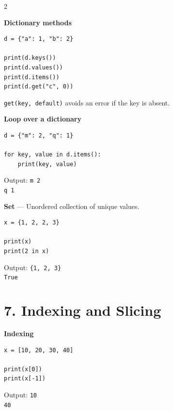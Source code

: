 \documentclass[10pt,a4paper]{article}
\begin{document}
\begin{multicols}{2}
\begin{card}
\textbf{Dictionary methods}

\begin{lstlisting}[style=pythonstyle]
d = {"a": 1, "b": 2}

print(d.keys())
print(d.values())
print(d.items())
print(d.get("c", 0))
\end{lstlisting}

\texttt{get(key, default)} avoids an error if the key is absent.
\end{card}

\begin{card}
\textbf{Loop over a dictionary}

\begin{lstlisting}[style=pythonstyle]
d = {"m": 2, "q": 1}

for key, value in d.items():
    print(key, value)
\end{lstlisting}

Output:
\texttt{m 2}\\
\texttt{q 1}
\end{card}

\begin{card}
\textbf{Set} --- Unordered collection of unique values.

\begin{lstlisting}[style=pythonstyle]
x = {1, 2, 2, 3}

print(x)
print(2 in x)
\end{lstlisting}

Output:
\texttt{\{1, 2, 3\}}\\
\texttt{True}
\end{card}

\section*{7. Indexing and Slicing}

\begin{card}
\textbf{Indexing}

\begin{lstlisting}[style=pythonstyle]
x = [10, 20, 30, 40]

print(x[0])
print(x[-1])
\end{lstlisting}

Output:
\texttt{10}\\
\texttt{40}


\end{card}
\end{multicols}
\end{document}
